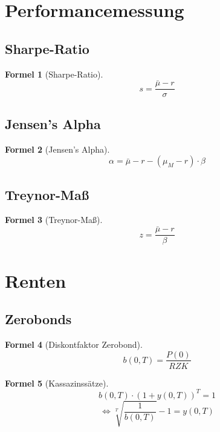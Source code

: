 \documentclass[a4paper]{article}
\theoremstyle{break}
\newtheorem{formula}{Formel}[section]
\begin{document}
    \section{Performancemessung}
    \subsection{Sharpe-Ratio}
    \begin{formula}[Sharpe-Ratio]
        $$s = \frac{\bar{\mu} - r}{\sigma}$$
    \end{formula}
    \subsection{Jensen's Alpha}
    \begin{formula}[Jensen's Alpha]
        $$\alpha = \bar{\mu} - r - (\mu_M - r)  \cdot \beta$$
    \end{formula}
    \subsection{Treynor-Maß}
    \begin{formula}[Treynor-Maß]
        $$z = \frac{\bar{\mu} - r}{\beta}$$
    \end{formula}
    \section{Renten}
    \subsection{Zerobonds}
    \begin{formula}[Diskontfaktor Zerobond]
        $$b(0,T) = \frac{P(0)}{RZK}$$
    \end{formula}
    \begin{formula}[Kassazinssätze]
        $$b(0,T) \cdot (1+y(0, T))^T = 1$$
        $$\Leftrightarrow \sqrt[T]{\frac{1}{b(0,T)}} -1 = y(0,T)$$
    \end{formula}
\end{document}
